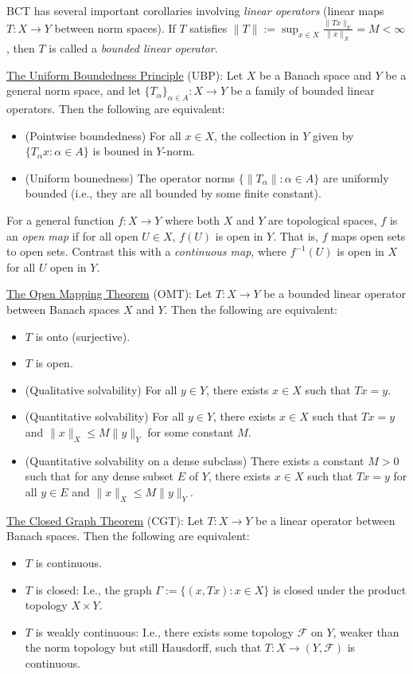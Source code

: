 \documentclass[12pt]{article}
\begin{document}
BCT has several important corollaries involving {\it linear operators}
(linear maps $T : X \rightarrow Y$ between norm spaces).
If $T$ satisfies $\|T\| := \sup_{x\in X}\frac{\|Tx\|_Y}{\|x\|_X} = M < \infty$,
then $T$ is called a {\it bounded linear operator}.

\hangindent 12pt
\underline{The Uniform Boundedness Principle} (UBP):
Let $X$ be a Banach space and $Y$ be a general norm space, and let
$\{T_\alpha\}_{\alpha\in A} : X \rightarrow Y$ be a family of bounded linear 
operators.
Then the following are equivalent:
\begin{itemize}
\item (Pointwise boundedness) For all $x\in X$, the collection in $Y$ given by
$\{T_\alpha x : \alpha \in A\}$ is bouned in $Y$-norm.
\item (Uniform bounedness) The operator norms $\{\|T_\alpha\| : \alpha\in A\}$
are uniformly bounded (i.e., they are all bounded by some finite constant).
\end{itemize}

For a general function $f : X \rightarrow Y$ where both $X$ and $Y$ are
topological spaces, $f$ is an {\it open map} if for all open $U \in X$, 
$f(U)$ is open in $Y$.
That is, $f$ maps open sets to open sets.
Contrast this with a {\it continuous map}, where $f^{-1}(U)$ is open in $X$
for all $U$ open in $Y$.

\hangindent 12pt
\underline{The Open Mapping Theorem} (OMT):
Let $T : X \rightarrow Y$ be a bounded linear operator between Banach
spaces $X$ and $Y$.
Then the following are equivalent:
\begin{itemize}
\item $T$ is onto (surjective).
\item $T$ is open.
\item (Qualitative solvability) For all $y\in Y$, there exists $x\in X$ such
that $Tx = y$.
\item (Quantitative solvability) For all $y\in Y$, there exists $x\in X$ such
that $Tx = y$ and $\|x\|_X \leq M\|y\|_Y$ for some constant $M$.
\item (Quantitative solvability on a dense subclass) There exists a constant
$M > 0$ such that for any dense subset $E$ of $Y$, there exists $x\in X$
such that $Tx = y$ for all $y \in E$ and $\|x\|_X \leq M\|y\|_Y$.
\end{itemize}

\hangindent 12pt
\underline{The Closed Graph Theorem} (CGT):
Let $T:X\rightarrow Y$ be a linear operator between Banach spaces.
Then the following are equivalent:
\begin{itemize}
\item $T$ is continuous.
\item $T$ is closed: I.e., the graph $\Gamma := \{(x,Tx) : x\in X\}$
is closed under the product topology $X \times Y$.
\item $T$ is weakly continuous: I.e., there exists some topology $\mathcal{F}$
on $Y$, weaker than the norm topology but still Hausdorff, such that
$T : X \rightarrow (Y,\mathcal{F})$ is continuous.
\end{itemize}
\end{document}
